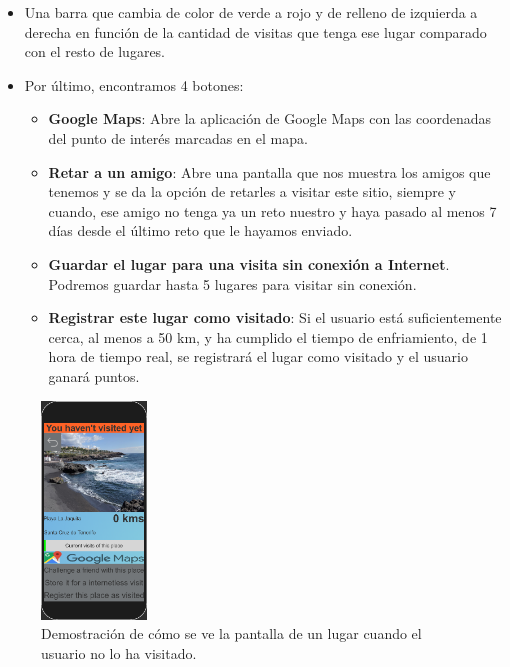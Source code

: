 \begin{itemize}
\begin{itemize}
    \item Una barra que cambia de color de verde a rojo y de relleno de izquierda a derecha en función de la cantidad de visitas que tenga ese lugar comparado con el resto de lugares.
    
    \item Por último, encontramos 4 botones:
        \begin{itemize}
            \item \textbf{Google Maps}: Abre la aplicación de Google Maps con las coordenadas del punto de interés marcadas en el mapa.
            
            \item \textbf{Retar a un amigo}: Abre una pantalla que nos muestra los amigos que tenemos y se da la opción de retarles a visitar este sitio, siempre y cuando, ese amigo no tenga ya un reto nuestro y haya pasado al menos 7 días desde el último reto que le hayamos enviado.
            
            \item \textbf{Guardar el lugar para una visita sin conexión a Internet}. Podremos guardar hasta 5 lugares para visitar sin conexión.
            
            \item \textbf{Registrar este lugar como visitado}: Si el usuario está suficientemente cerca, al menos a 50 km, y ha cumplido el tiempo de enfriamiento, de 1 hora de tiempo real, se registrará el lugar como visitado y el usuario ganará puntos.
        \end{itemize}
    \end{itemize}

\begin{figure}[H]
    \centering
    \includegraphics[width=0.25\textwidth]{Memoria_TFG_LaTeX/images/pantallaLugar.PNG}
    \caption{Demostración de cómo se ve la pantalla de un lugar cuando el usuario no lo ha visitado.}
    \label{fig:pantallaLugarNoVisitado}
\end{figure}


\end{itemize}

